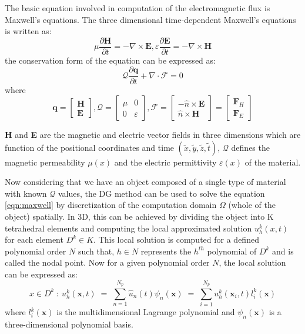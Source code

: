 The basic equation involved in computation of the electromagnetic flux is Maxwell's equations. The
three dimensional time-dependent Maxwell's equations \cite{hesthaven_nodal_2008} is written as:
\begin{equation}\label{eqn:maxwellbase}
    \mu \frac{\partial{\textbf{H}}}{\partial{t}} = - \nabla \times \textbf{E},\varepsilon \frac{\partial{\textbf{E}}}{ \partial{t}} = - \nabla  \times \textbf{H}
\end{equation}
the conservation form of the equation can be expressed as:
\begin{equation}\label{eqn:maxwell}
    \mathcal{Q}\frac{\partial\textbf{q}}{\partial{t}}  + \nabla  \cdot \mathcal{F} = 0
\end{equation}
where
\begin{equation}\label{eqn:maxwellexpansion}
\textbf{q} =  \begin{bmatrix}\textbf{H} \\ \textbf{E} \end{bmatrix},
\mathcal{Q} =  \begin{bmatrix} \mu & 0 \\ 0 &  \varepsilon \end{bmatrix},
\mathcal{F} = \begin{bmatrix}  - \widehat{n} \times \textbf{E} \\ \widehat{n} \times \textbf{H} \end{bmatrix} = \begin{bmatrix} \textbf{F}_H \\ \textbf{F}_E \end{bmatrix}
\end{equation}

\textbf{H} and \textbf{E} are the magnetic and electric vector fields in
three dimensions which are function of the positional coordinates and time
$ (\tilde{x},\tilde{y}, \tilde{z}, \tilde{t}) $, $ \mathcal{Q} $ defines the magnetic permeability
$ \mu(x) $ and the electric permittivity $ \varepsilon(x) $ of the material.

Now considering that we have an object composed of a single type of material with known $ \mathcal{Q} $
values, the DG method can be used to solve the equation \ref{eqn:maxwell} by discretization of the
computation domain $ \Omega $ (whole of the object) spatially. In 3D, this can be achieved by dividing the object
into K tetrahedral elements and computing the local approximated solution $ u_h^k(x,t) $ for
each element $ D^k \in K $. This local solution is computed for a defined polynomial order $ N $ such that,
$ h \in N $ represents the $ h^{th} $ polynomial of $ D^k $ and is called the nodal point.
Now for a given polynomial order $ N $, the local solution can be expressed \cite{hesthaven_nodal_2008} as:
\begin{equation}\label{eqn:nodal_form}
    x \in D^k \ : \ u^k_{h}(\textbf{x}, t) \; = \; \sum_{n=1}^{N_p} \hat{u}_n(t) \psi_{n}(\textbf{x}) \; = \; \sum_{i=1}^{N_p} u^k_{h}(\textbf{x}_{i}, t) l^k_{i}(\textbf{x})
\end{equation}
where $ l^k_{i}(\textbf{x}) $ is the multidimensional Lagrange polynomial and $ \psi_{n}(\textbf{x}) $
is a three-dimensional polynomial basis.

